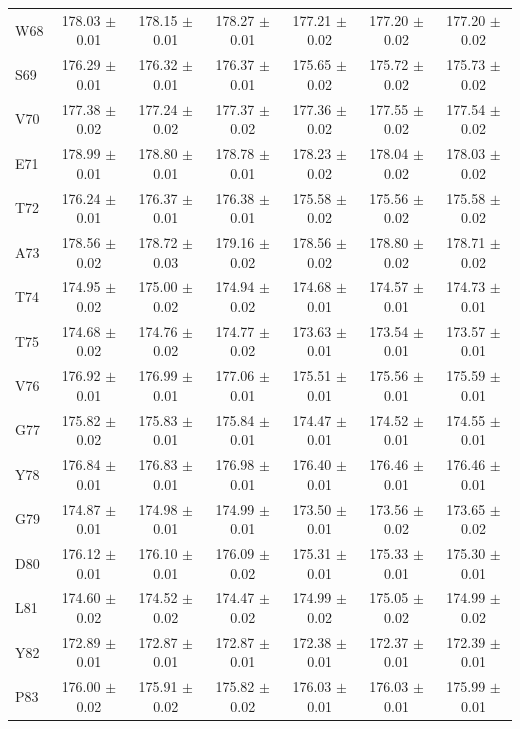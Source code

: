 \documentclass[%
 aip,
 amsmath,amssymb,
 preprint,%
]{revtex4-1}
\begin{document}
\begin{center}
\begin{longtable}{l|c|c|c|c|c|c}
W68 & 178.03 $\pm$ 0.01 & 178.15 $\pm$ 0.01 & 178.27 $\pm$ 0.01 & 177.21 $\pm$ 0.02 & 177.20 $\pm$ 0.02 & 177.20 $\pm$ 0.02 \\
S69 & 176.29 $\pm$ 0.01 & 176.32 $\pm$ 0.01 & 176.37 $\pm$ 0.01 & 175.65 $\pm$ 0.02 & 175.72 $\pm$ 0.02 & 175.73 $\pm$ 0.02 \\
V70 & 177.38 $\pm$ 0.02 & 177.24 $\pm$ 0.02 & 177.37 $\pm$ 0.02 & 177.36 $\pm$ 0.02 & 177.55 $\pm$ 0.02 & 177.54 $\pm$ 0.02 \\
E71 & 178.99 $\pm$ 0.01 & 178.80 $\pm$ 0.01 & 178.78 $\pm$ 0.01 & 178.23 $\pm$ 0.02 & 178.04 $\pm$ 0.02 & 178.03 $\pm$ 0.02 \\
T72 & 176.24 $\pm$ 0.01 & 176.37 $\pm$ 0.01 & 176.38 $\pm$ 0.01 & 175.58 $\pm$ 0.02 & 175.56 $\pm$ 0.02 & 175.58 $\pm$ 0.02 \\
A73 & 178.56 $\pm$ 0.02 & 178.72 $\pm$ 0.03 & 179.16 $\pm$ 0.02 & 178.56 $\pm$ 0.02 & 178.80 $\pm$ 0.02 & 178.71 $\pm$ 0.02 \\
T74 & 174.95 $\pm$ 0.02 & 175.00 $\pm$ 0.02 & 174.94 $\pm$ 0.02 & 174.68 $\pm$ 0.01 & 174.57 $\pm$ 0.01 & 174.73 $\pm$ 0.01 \\
T75 & 174.68 $\pm$ 0.02 & 174.76 $\pm$ 0.02 & 174.77 $\pm$ 0.02 & 173.63 $\pm$ 0.01 & 173.54 $\pm$ 0.01 & 173.57 $\pm$ 0.01 \\
V76 & 176.92 $\pm$ 0.01 & 176.99 $\pm$ 0.01 & 177.06 $\pm$ 0.01 & 175.51 $\pm$ 0.01 & 175.56 $\pm$ 0.01 & 175.59 $\pm$ 0.01 \\
G77 & 175.82 $\pm$ 0.02 & 175.83 $\pm$ 0.01 & 175.84 $\pm$ 0.01 & 174.47 $\pm$ 0.01 & 174.52 $\pm$ 0.01 & 174.55 $\pm$ 0.01 \\
Y78 & 176.84 $\pm$ 0.01 & 176.83 $\pm$ 0.01 & 176.98 $\pm$ 0.01 & 176.40 $\pm$ 0.01 & 176.46 $\pm$ 0.01 & 176.46 $\pm$ 0.01 \\
G79 & 174.87 $\pm$ 0.01 & 174.98 $\pm$ 0.01 & 174.99 $\pm$ 0.01 & 173.50 $\pm$ 0.01 & 173.56 $\pm$ 0.02 & 173.65 $\pm$ 0.02 \\
D80 & 176.12 $\pm$ 0.01 & 176.10 $\pm$ 0.01 & 176.09 $\pm$ 0.02 & 175.31 $\pm$ 0.01 & 175.33 $\pm$ 0.01 & 175.30 $\pm$ 0.01 \\
L81 & 174.60 $\pm$ 0.02 & 174.52 $\pm$ 0.02 & 174.47 $\pm$ 0.02 & 174.99 $\pm$ 0.02 & 175.05 $\pm$ 0.02 & 174.99 $\pm$ 0.02 \\
Y82 & 172.89 $\pm$ 0.01 & 172.87 $\pm$ 0.01 & 172.87 $\pm$ 0.01 & 172.38 $\pm$ 0.01 & 172.37 $\pm$ 0.01 & 172.39 $\pm$ 0.01 \\
P83 & 176.00 $\pm$ 0.02 & 175.91 $\pm$ 0.02 & 175.82 $\pm$ 0.02 & 176.03 $\pm$ 0.01 & 176.03 $\pm$ 0.01 & 175.99 $\pm$ 0.01 \\

\end{longtable}
\end{center}
\end{document}
